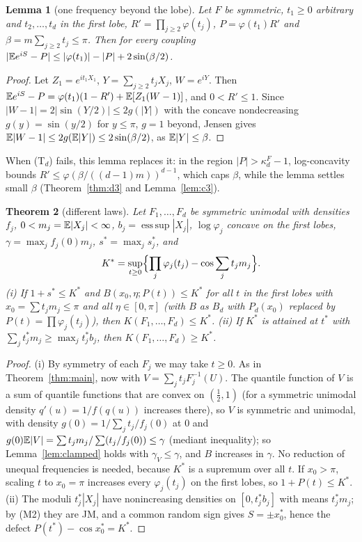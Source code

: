\documentclass[11pt]{amsart}
\newtheorem{theorem}{Theorem}[section]\newtheorem{proposition}[theorem]{Proposition}\newtheorem{lemma}[theorem]{Lemma}
\theoremstyle{definition}\newtheorem{definition}[theorem]{Definition}\theoremstyle{remark}\newtheorem{remark}[theorem]{Remark}
\begin{document}
\begin{lemma}[one frequency beyond the lobe]\label{lem:onebeyond}
Let $F$ be symmetric, $t_1\ge0$ arbitrary and $t_2,\dots,t_d$ in the first lobe, $R'=\prod_{j\ge2}\varphi(t_j)$, $P=\varphi(t_1)R'$ and $\beta=m\sum_{j\ge2}t_j\le\pi$. Then for
every coupling $|\mathbb E e^{iS}-P|\le|\varphi(t_1)|-|P|+2\sin(\beta/2)$.
\end{lemma}
\begin{proof}Let $Z_1=e^{it_1X_1}$, $Y=\sum_{j\ge2}t_jX_j$, $W=e^{iY}$. Then $\mathbb E e^{iS}-P=\varphi(t_1)(1-R')+\mathbb E[Z_1(W-1)]$, and $0<R'\le1$. Since $|W-1|=2|\sin(Y/2)|\le2g(|Y|)$
with the concave nondecreasing $g(y)=\sin(y/2)$ for $y\le\pi$, $g=1$ beyond, Jensen gives $\mathbb E|W-1|\le2g(\mathbb E|Y|)\le2\sin(\beta/2)$, as $\mathbb E|Y|\le\beta$.\end{proof}
\noindent When (T$_d$) fails, this lemma replaces it: in the region $|P|>\kappa_d^F-1$, log-concavity bounds $R'\le\varphi(\beta/((d-1)m))^{d-1}$, which caps $\beta$, while the lemma
settles small $\beta$ (Theorem~\ref{thm:d3} and Lemma~\ref{lem:c3}).

\begin{theorem}[different laws]\label{thm:het}
Let $F_1,\dots,F_d$ be symmetric unimodal with densities $f_j$, $0<m_j=\mathbb E|X_j|<\infty$, $b_j=\operatorname{ess\,sup}|X_j|$, $\log\varphi_j$ concave on the first lobes, $\gamma=\max_jf_j(0)m_j$,
$s^*=\max_js_j^*$, and
\[K^*=\sup_{t\ge0}\Bigl\{\prod_j\varphi_j(t_j)-\cos\sum_jt_jm_j\Bigr\}.\]
(i) If $1+s^*\le K^*$ and $B(x_0,\eta;P(t))\le K^*$ for all $t$ in the first lobes with $x_0=\sum t_jm_j\le\pi$ and all $\eta\in[0,\pi]$ (with $B$ as $B_d$ with $P_d(x_0)$ replaced by
$P(t)=\prod\varphi_j(t_j)$), then $K(F_1,\dots,F_d)\le K^*$. (ii) If $K^*$ is attained at $t^*$ with $\sum_jt_j^*m_j\ge\max_jt_j^*b_j$, then $K(F_1,\dots,F_d)\ge K^*$.
\end{theorem}
\begin{proof}(i) By symmetry of each $F_j$ we may take $t\ge0$. As in Theorem~\ref{thm:main}, now with $V=\sum_jt_jF_j^{-1}(U)$. The quantile function of $V$ is a sum of quantile functions that are convex on $(\frac12,1)$ (for a symmetric unimodal density
$q'(u)=1/f(q(u))$ increases there), so $V$ is symmetric and unimodal, with density $g(0)=1/\sum_jt_j/f_j(0)$ at $0$ and $g(0)\mathbb E|V|=\sum t_jm_j/\sum(t_j/f_j(0))\le\gamma$ (mediant inequality); so Lemma~\ref{lem:clamped} holds with $\gamma_V\le\gamma$, and $B$ increases in $\gamma$.
No reduction of unequal frequencies is needed, because $K^*$ is a supremum over all $t$. If $x_0>\pi$, scaling $t$ to $x_0=\pi$ increases every $\varphi_j(t_j)$ on the first lobes, so
$1+P(t)\le K^*$. (ii) The moduli $t_j^*|X_j|$ have nonincreasing densities on $[0,t_j^*b_j]$ with means $t_j^*m_j$; by (M2) they are JM, and a common random sign gives $S=\pm x_0^*$,
hence the defect $P(t^*)-\cos x_0^*=K^*$.\end{proof}
\end{document}
